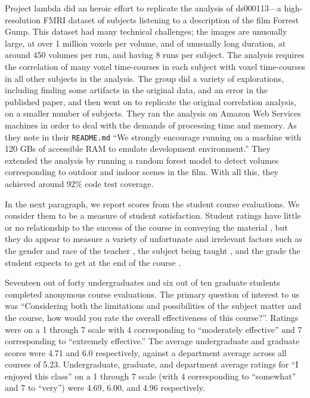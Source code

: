 Project lambda did an heroic effort to replicate the analysis of ds000113---a
high-resolution FMRI dataset of subjects listening to a description of the
film Forrest Gump.  This dataset had many technical challenges; the images are
unusually large, at over 1 million voxels per volume, and of unusually long
duration, at around 450 volumes per run, and having 8 runs per subject.  The
analysis requires the correlation of many voxel time-courses in each subject
with voxel time-courses in all other subjects in the analysis.  The group did
a variety of explorations, including finding some artifacts in the original
data, and an error in the published paper, and then went on to replicate the
original correlation analysis, on a smaller number of subjects.  They ran the
analysis on Amazon Web Services machines in order to deal with the demands of
processing time and memory.  As they note in their \texttt{README.md} ``We
strongly encourage running on a machine with 120 GBs of accessible RAM to
emulate development environment.'' They extended the analysis by running a
random forest model to detect volumes corresponding to outdoor and indoor
scenes in the film.  With all this, they achieved around 92\% code test
coverage.

In the next paragraph, we report scores from the student course evaluations.
We consider them to be a measure of student satisfaction.  Student ratings
have little or no relationship to the success of the course in conveying the
material \citep{uttl2017meta, boring2016student}, but they do appear to measure
a variety of unfortunate and irrelevant factors such as the gender and race of
the teacher \citep{boring2016student}, the subject being taught
\citep{uttl2017student}, and the grade the student expects to get at the end of
the course \citep{krautmann1999grades, worthington2002impact}.

Seventeen out of forty undergraduates and six out of ten graduate students
completed anonymous course evaluations.  The primary question of interest to
us was ``Considering both the limitations and possibilities of the subject
matter and the course, how would you rate the overall effectiveness of this
course?''.  Ratings were on a 1 through 7 scale with 4 corresponding to
``moderately effective'' and 7 corresponding to ``extremely effective.'' The
average undergraduate and graduate scores were 4.71 and 6.0 respectively,
against a department average across all courses of 5.23.  Undergraduate,
graduate, and department average ratings for ``I enjoyed this class'' on a 1
through 7 scale (with 4 corresponding to ``somewhat'' and 7 to ``very'') were
4.69, 6.00, and 4.96 respectively.

